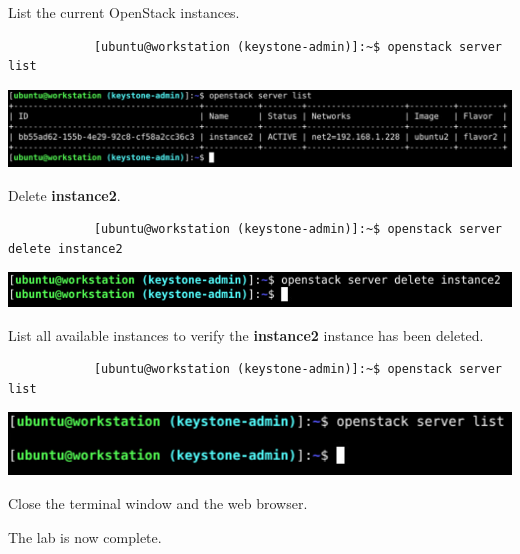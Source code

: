 \documentclass[letterpaper, 12pt]{article}
\begin{document}
\begin{enumerate}
    \begin{labstep}
        List the current OpenStack instances.
        \begin{lstlisting}
            [ubuntu@workstation (keystone-admin)]:~$ openstack server list
        \end{lstlisting}

        \begin{center}
            \includegraphics[width=\linewidth]{images/part5/step12.png}
        \end{center}
    \end{labstep}

    \begin{labstep}
        Delete \textbf{instance2}.
        \begin{lstlisting}
            [ubuntu@workstation (keystone-admin)]:~$ openstack server delete instance2
        \end{lstlisting}

        \begin{center}
            \includegraphics[width=\linewidth]{images/part5/step13.png}
        \end{center}
    \end{labstep}

    \begin{labstep}
        List all available instances to verify the \textbf{instance2} instance has been deleted.
        \begin{lstlisting}
            [ubuntu@workstation (keystone-admin)]:~$ openstack server list
        \end{lstlisting}

        \begin{center}
            \includegraphics[width=\linewidth]{images/part5/step14.png}
        \end{center}
    \end{labstep}

    \begin{labstep}
        Close the terminal window and the web browser.
    \end{labstep}

    \begin{labstep}
        The lab is now complete.
    \end{labstep}

\end{enumerate}
\end{document}

